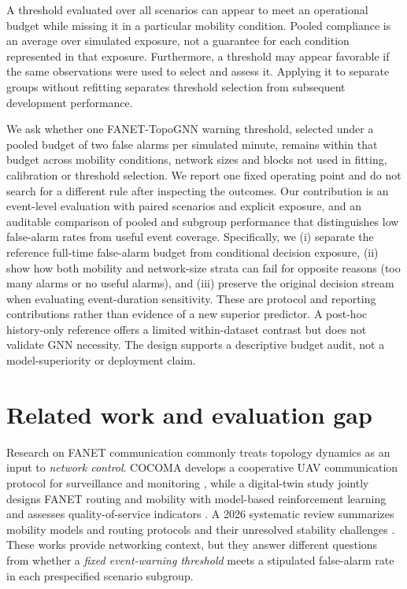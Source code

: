 \documentclass[10pt,a4paper]{article}
\begin{document}
A threshold evaluated over all scenarios can appear to meet an operational budget while missing it in a particular mobility condition. Pooled compliance is an average over simulated exposure, not a guarantee for each condition represented in that exposure. Furthermore, a threshold may appear favorable if the same observations were used to select and assess it. Applying it to separate groups without refitting separates threshold selection from subsequent development performance.

We ask whether one FANET-TopoGNN warning threshold, selected under a pooled budget of two false alarms per simulated minute, remains within that budget across mobility conditions, network sizes and blocks not used in fitting, calibration or threshold selection. We report one fixed operating point and do not search for a different rule after inspecting the outcomes. Our contribution is an event-level evaluation with paired scenarios and explicit exposure, and an auditable comparison of pooled and subgroup performance that distinguishes low false-alarm rates from useful event coverage. Specifically, we (i) separate the reference full-time false-alarm budget from conditional decision exposure, (ii) show how both mobility and network-size strata can fail for opposite reasons (too many alarms or no useful alarms), and (iii) preserve the original decision stream when evaluating event-duration sensitivity. These are protocol and reporting contributions rather than evidence of a new superior predictor. A post-hoc history-only reference offers a limited within-dataset contrast but does not validate GNN necessity. The design supports a descriptive budget audit, not a model-superiority or deployment claim.


\section{Related work and evaluation gap}\label{sec:related}

Research on FANET communication commonly treats topology dynamics as an input to \emph{network control}. COCOMA develops a cooperative UAV communication protocol for surveillance and monitoring \cite{cocoma2024}, while a digital-twin study jointly designs FANET routing and mobility with model-based reinforcement learning and assesses quality-of-service indicators \cite{elbasioni2025digital}. A 2026 systematic review summarizes mobility models and routing protocols and their unresolved stability challenges \cite{kaur2026fanet}. These works provide networking context, but they answer different questions from whether a \emph{fixed event-warning threshold} meets a stipulated false-alarm rate in each prespecified scenario subgroup.
\end{document}
